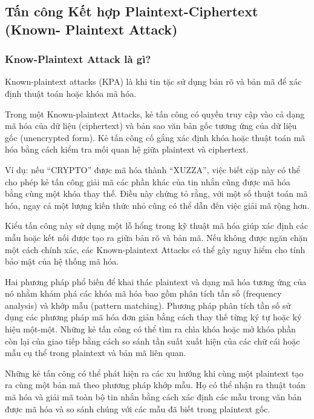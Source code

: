 \subsection{Tấn công Kết hợp Plaintext-Ciphertext (Known- Plaintext Attack)
}
\subsubsection{Know-Plaintext Attack là gì?}
Known-plaintext attacks (KPA) là khi tin tặc sử dụng bản rõ và bản mã để xác định thuật toán hoặc khóa mã hóa.

Trong một Known-plaintext Attacks, kẻ tấn công có quyền truy cập vào cả dạng mã hóa của dữ liệu (ciphertext) và bản sao văn bản gốc tương ứng của dữ liệu gốc (unencrypted form). Kẻ tấn công cố gắng xác định khóa hoặc thuật toán mã hóa bằng cách kiểm tra mối quan hệ giữa plaintext và ciphertext.

Ví dụ: nếu “CRYPTO” được mã hóa thành “XUZZA”, việc biết cặp này có thể cho phép kẻ tấn công giải mã các phần khác của tin nhắn cũng được mã hóa bằng cùng một khóa thay thế. Điều này chứng tỏ rằng, với một số thuật toán mã hóa, ngay cả một lượng kiến thức nhỏ cũng có thể dẫn đến việc giải mã rộng hơn.

Kiểu tấn công này sử dụng một lỗ hổng trong kỹ thuật mã hóa giúp xác định các mẫu hoặc kết nối được tạo ra giữa bản rõ và bản mã. Nếu không được ngăn chặn một cách chính xác, các Known-plaintext Attacks có thể gây nguy hiểm cho tính bảo mật của hệ thống mã hóa.

Hai phương pháp phổ biến để khai thác plaintext và dạng mã hóa tương ứng của nó nhằm khám phá các khóa mã hóa bao gồm phân tích tần số (frequency analysis) và khớp mẫu (pattern matching). Phương pháp phân tích tần số sử dụng các phương pháp mã hóa đơn giản bằng cách thay thế từng ký tự hoặc ký hiệu một-một. Những kẻ tấn công có thể tìm ra chìa khóa hoặc mở khóa phần còn lại của giao tiếp bằng cách so sánh tần suất xuất hiện của các chữ cái hoặc mẫu cụ thể trong plaintext và bản mã liên quan.

Những kẻ tấn công có thể phát hiện ra các xu hướng khi cùng một plaintext tạo ra cùng một bản mã theo phương pháp khớp mẫu. Họ có thể nhận ra thuật toán mã hóa và giải mã toàn bộ tin nhắn bằng cách xác định các mẫu trong văn bản được mã hóa và so sánh chúng với các mẫu đã biết trong plaintext gốc.

